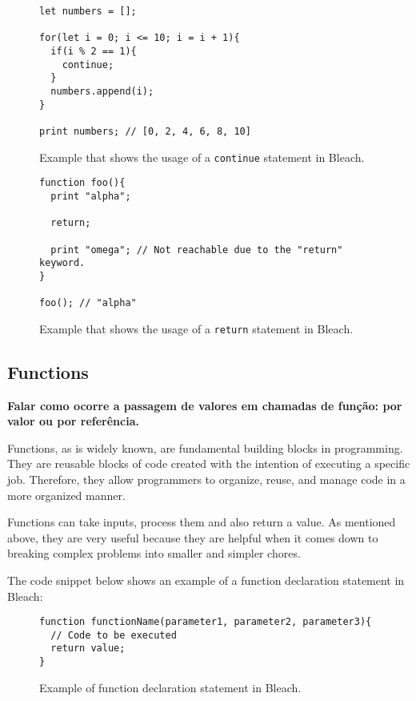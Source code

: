 \begin{itemize}
\begin{figure}[H]
    \centering
    \begin{lstlisting}
let numbers = [];

for(let i = 0; i <= 10; i = i + 1){
  if(i % 2 == 1){
    continue;
  }
  numbers.append(i);
}

print numbers; // [0, 2, 4, 6, 8, 10]
    \end{lstlisting}
    \caption{Example that shows the usage of a \texttt{continue} statement in Bleach.}
\end{figure}

\begin{figure}[H]
    \centering
    \begin{lstlisting}
function foo(){
  print "alpha";

  return;

  print "omega"; // Not reachable due to the "return" keyword.
}

foo(); // "alpha"
    \end{lstlisting}
    \caption{Example that shows the usage of a \texttt{return} statement in Bleach.}
\end{figure}
\end{itemize}

\subsection{Functions}
\textbf{Falar como ocorre a passagem de valores em chamadas de função: por valor ou por referência.}

Functions, as is widely known, are fundamental building blocks in programming. They are reusable blocks of code created with the intention of executing a specific job. Therefore, they allow programmers to organize, reuse, and manage code in a more organized manner.

Functions can take inputs, process them and also return a value. As mentioned above, they are very useful because they are helpful when it comes down to breaking complex problems into smaller and simpler chores.

The code snippet below shows an example of a function declaration statement in Bleach:

\begin{figure}[H]
    \centering
    \begin{lstlisting}
function functionName(parameter1, parameter2, parameter3){
  // Code to be executed
  return value;
}
    \end{lstlisting}
    \caption{Example of function declaration statement in Bleach.}
\end{figure}

